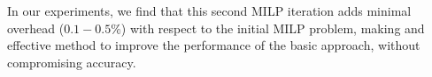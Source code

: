 In our experiments, we find that this second MILP iteration adds
minimal overhead ($0.1-0.5\%$) with respect to the initial MILP
problem, making \tslice and effective method to improve the performance of the basic approach, without compromising accuracy.



% 
% 
% 


